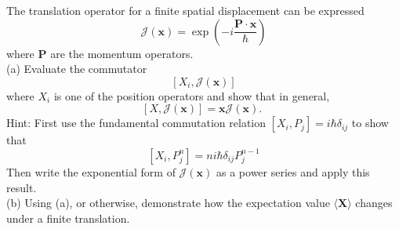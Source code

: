 
\begin{problem}
	The translation operator for a finite spatial displacement can be expressed
\[
\mathcal{J}(\boldsymbol{x})=\exp \left(-i \frac{\boldsymbol{P} \cdot \boldsymbol{x}}{\hbar}\right)
\]
where $\boldsymbol{P}$ are the momentum operators.\\
(a) Evaluate the commutator
\[
\left[X_i, \mathcal{J}(\boldsymbol{x})\right]
\]
where $X_i$ is one of the position operators and show that in general,
\[
[X, \mathcal{J}(\boldsymbol{x})]=\boldsymbol{x} \mathcal{J}(\boldsymbol{x}) \text {. }
\]
Hint: First use the fundamental commutation relation $\left[X_i, P_j\right]=i \hbar \delta_{i j}$ to show that
\[
\left[X_i, P_j^n\right]=n i \hbar \delta_{i j} P_j^{n-1}
\]
Then write the exponential form of $\mathcal{J}(\boldsymbol{x})$ as a power series and apply this result.\\
(b) Using (a), or otherwise, demonstrate how the expectation value $\langle\boldsymbol{X}\rangle$ changes under a finite translation.
\end{problem}
